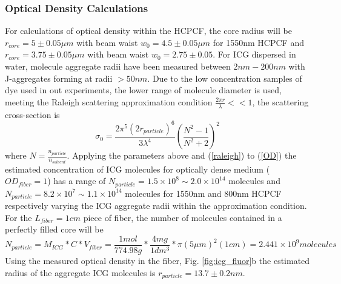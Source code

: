 \clearpage
\subsubsection{Optical Density Calculations}
For calculations of optical density within the HCPCF, the core radius will be  $r_{core} = 5\pm 0.05\mu m$ with beam waist $w_0 = 4.5 \pm 0.05\mu m$ for 1550nm HCPCF and $r_{core} = 3.75 \pm0.05\mu m$ with beam waist $w_0 = 2.75 \pm 0.05$. For ICG dispersed in water, molecule aggregate radii have been measured between $2nm - 200nm$ \cite{dedora} with J-aggregates forming at radii $>50nm$\cite{weigand}. Due to the low concentration samples of dye used in out experiments, the lower range of molecule diameter is used, meeting the Raleigh scattering approximation condition $\frac{2\pi r}{\lambda} <<1$, the scattering cross-section is 
\begin{equation}
	\sigma_0 = \frac{2\pi^5 (2r_{particle})^6}{3\lambda^4}(\frac{N^2 -1}{N^2+2})^2
	\label{raleigh}
\end{equation}
where $N=\frac{n_{particle}}{n_{solvent}}$. Applying the parameters above and  (\ref{raleigh}) to (\ref{OD}) the estimated concentration of ICG molecules for optically dense medium ($OD_{fiber}=1$) has a range of $N_{particle} = 1.5\times 10^8 \sim 2.0\times 10^{14}$ molecules and $N_{particle} = 8.2\times 10^7 \sim 1.1\times 10^{14}$ molecules for 1550nm and 800nm HCPCF respectively varying the ICG aggregate radii within the approximation condition. \\

For the $L_{fiber}=1cm$  piece of fiber, the number of molecules contained in a perfectly filled core will be
\begin{equation}
	N_{particle} = M_{ICG}*C*V_{fiber}=\frac{1 mol}{774.98g}*\frac{4mg}{1dm^3}*\pi(5\mu m)^2(1cm) = 2.441\times10^9 molecules
\end{equation} 
Using the measured optical density in the fiber, Fig. \ref{fig:icg_fluor}b the estimated radius of the aggregate ICG molecules is $r_{particle} = 13.7 \pm 0.2nm$.  

\clearpage